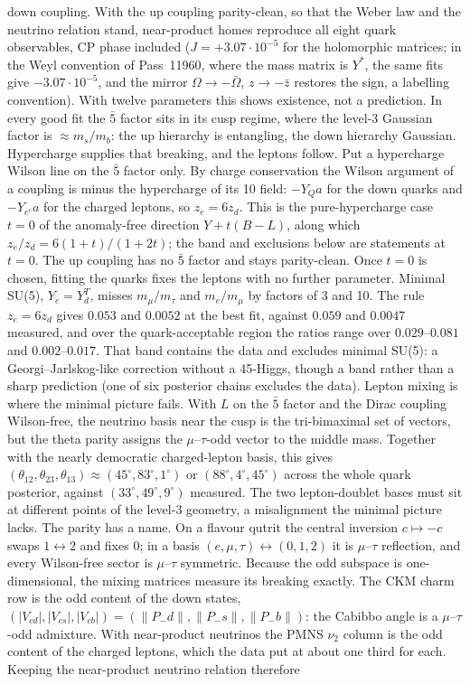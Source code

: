down coupling. With the up coupling parity-clean, so that the Weber law and the neutrino relation stand, near-product homes reproduce all eight quark observables, CP phase included ($J=+3.07\cdot10^{-5}$ for the holomorphic matrices; in the Weyl convention of Pass~11960, where the mass matrix is $Y^*$, the same fits give $-3.07\cdot10^{-5}$, and the mirror $\Omega\to-\bar\Omega$, $z\to-\bar z$ restores the sign, a labelling convention). With twelve parameters this shows existence, not a prediction. In every good fit the $\bar5$ factor sits in its cusp regime, where the level-3 Gaussian factor is $\approx m_s/m_b$: the up hierarchy is entangling, the down hierarchy Gaussian.  Hypercharge supplies that breaking, and the leptons follow. Put a hypercharge Wilson line on the $\bar5$ factor only. By charge conservation the Wilson argument of a coupling is minus the hypercharge of its 10 field: $-Y_Q a$ for the down quarks and $-Y_{e^c}a$ for the charged leptons, so $z_e=6z_d$. This is the pure-hypercharge case $t=0$ of the anomaly-free direction $Y+t(B-L)$, along which $z_e/z_d=6(1+t)/(1+2t)$; the band and exclusions below are statements at $t=0$. The up coupling has no $\bar5$ factor and stays parity-clean. Once $t=0$ is chosen, fitting the quarks fixes the leptons with no further parameter. Minimal SU(5), $Y_e=Y_d^T$, misses $m_\mu/m_\tau$ and $m_e/m_\mu$ by factors of 3 and 10. The rule $z_e=6z_d$ gives $0.053$ and $0.0052$ at the best fit, against $0.059$ and $0.0047$ measured, and over the quark-acceptable region the ratios range over $0.029$--$0.081$ and $0.002$--$0.017$. That band contains the data and excludes minimal SU(5): a Georgi--Jarlskog-like correction without a 45-Higgs, though a band rather than a sharp prediction (one of six posterior chains excludes the data).  Lepton mixing is where the minimal picture fails. With $L$ on the $\bar5$ factor and the Dirac coupling Wilson-free, the neutrino basis near the cusp is the tri-bimaximal set of vectors, but the theta parity assigns the $\mu$--$\tau$-odd vector to the middle mass. Together with the nearly democratic charged-lepton basis, this gives $(\theta_{12},\theta_{23},\theta_{13})\approx(45^\circ,83^\circ,1^\circ)$ or $(88^\circ,4^\circ,45^\circ)$ across the whole quark posterior, against $(33^\circ,49^\circ,9^\circ)$ measured. The two lepton-doublet bases must sit at different points of the level-3 geometry, a misalignment the minimal picture lacks.  The parity has a name. On a flavour qutrit the central inversion $c\mapsto-c$ swaps $1\leftrightarrow2$ and fixes $0$; in a basis $(e,\mu,\tau)\leftrightarrow(0,1,2)$ it is $\mu$--$\tau$ reflection, and every Wilson-free sector is $\mu$--$\tau$ symmetric. Because the odd subspace is one-dimensional, the mixing matrices measure its breaking exactly. The CKM charm row is the odd content of the down states, $(|V_{cd}|,|V_{cs}|,|V_{cb}|)=(\|P_-d\|,\|P_-s\|,\|P_-b\|)$: the Cabibbo angle is a $\mu$--$\tau$-odd admixture. With near-product neutrinos the PMNS $\nu_2$ column is the odd content of the charged leptons, which the data put at about one third for each. Keeping the near-product neutrino relation therefore 